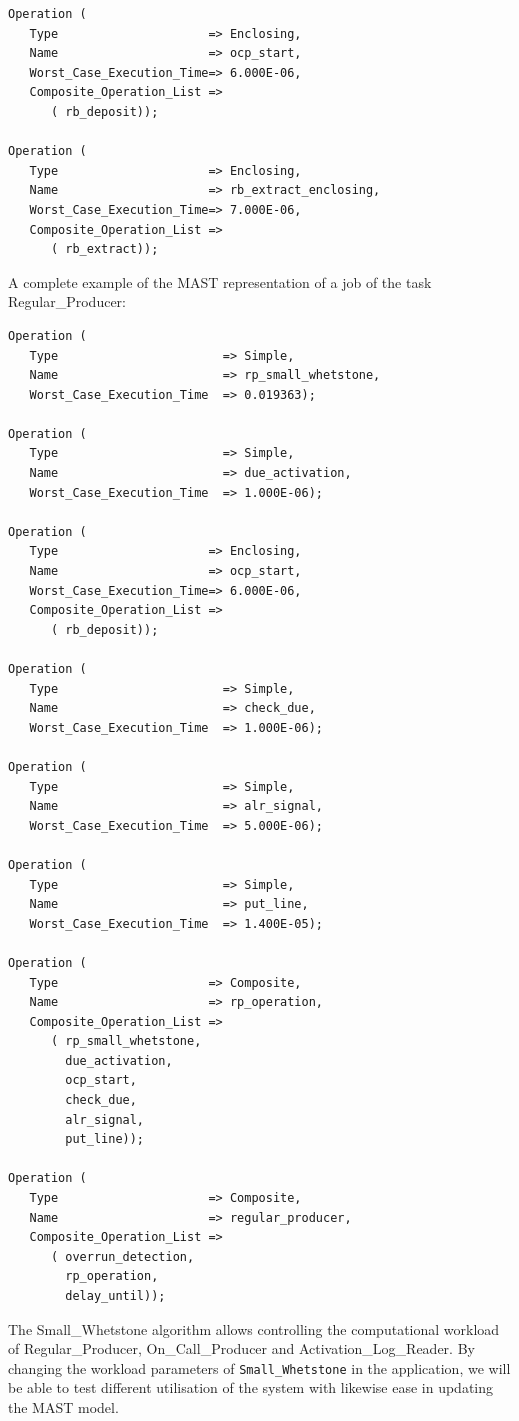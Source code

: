 \documentclass{article}
\begin{document}
\begin{lstlisting}
Operation (
   Type                     => Enclosing,
   Name                     => ocp_start,
   Worst_Case_Execution_Time=> 6.000E-06,
   Composite_Operation_List =>
      ( rb_deposit));

Operation (
   Type                     => Enclosing,
   Name                     => rb_extract_enclosing,
   Worst_Case_Execution_Time=> 7.000E-06,
   Composite_Operation_List =>
      ( rb_extract));
\end{lstlisting}

A complete example of the MAST representation of a job of the task Regular\_Producer:

\begin{lstlisting}
Operation (
   Type                       => Simple,
   Name                       => rp_small_whetstone,
   Worst_Case_Execution_Time  => 0.019363);

Operation (
   Type                       => Simple,
   Name                       => due_activation,
   Worst_Case_Execution_Time  => 1.000E-06);

Operation (
   Type                     => Enclosing,
   Name                     => ocp_start,
   Worst_Case_Execution_Time=> 6.000E-06,
   Composite_Operation_List =>
      ( rb_deposit));

Operation (
   Type                       => Simple,
   Name                       => check_due,
   Worst_Case_Execution_Time  => 1.000E-06);

Operation (
   Type                       => Simple,
   Name                       => alr_signal,
   Worst_Case_Execution_Time  => 5.000E-06);

Operation (
   Type                       => Simple,
   Name                       => put_line,
   Worst_Case_Execution_Time  => 1.400E-05);

Operation (
   Type                     => Composite,
   Name                     => rp_operation,
   Composite_Operation_List =>
      ( rp_small_whetstone,
        due_activation,
        ocp_start,
        check_due,
        alr_signal,
        put_line));

Operation (
   Type                     => Composite,
   Name                     => regular_producer,
   Composite_Operation_List =>
      ( overrun_detection,
        rp_operation,
        delay_until));
\end{lstlisting}

The Small\_Whetstone algorithm allows controlling the computational workload of Regular\_Producer, On\_Call\_Producer and Activation\_Log\_Reader. By changing the workload parameters of \texttt{Small\_Whetstone} in the application, we will be able to test different utilisation of the system with likewise ease in updating the MAST model.
\end{document}
